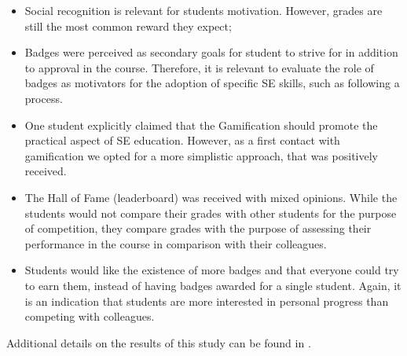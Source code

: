 \begin{itemize}
    \item Social recognition is relevant for students motivation. However, grades are still the most common reward they expect;
    \item Badges were perceived as secondary goals for student to strive for in addition to approval in the course. Therefore, it is relevant to evaluate the role of badges as motivators for the adoption of specific SE skills, such as following a process. 
    \item One student explicitly claimed that the Gamification should promote the practical aspect of SE education. However, as a first contact with gamification we opted for a more simplistic approach, that was positively received.
    \item The Hall of Fame (leaderboard) was received with mixed opinions. While the students would not compare their grades with other students for the purpose of competition, they compare grades with the purpose of assessing their performance in the course in comparison with their colleagues.
    \item Students would like the existence of more badges and that everyone could try to earn them, instead of having badges awarded for a single student. Again, it is an indication that students are more interested in personal progress than competing with colleagues.
    
\end{itemize}

Additional details on the results of this study can be found in \cite{Souza:2017}.
